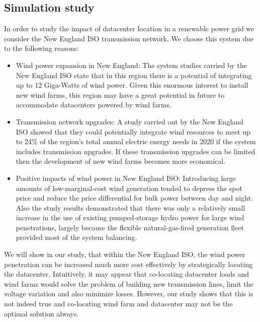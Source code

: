 \subsection{Simulation study}
In order to study the impact of datacenter location in a renewable power grid we consider the New England ISO transmission network. We choose this system due to the following reasons:
\begin{itemize}
\item{Wind power expansion in New England: The system studies carried by the New England ISO state that in this region there is a potential of integrating up to 12 Giga-Watts of wind power. Given this enormous interest to install new wind farms, this region may have a great potential in future to accommodate datacenters powered by wind farms.}
\item{Transmission network upgrades: A study carried out by the New England ISO showed that they could potentially integrate wind resources to meet up to 24\% of the region's total annual electric energy needs in 2020 if the system includes transmission
upgrades. If these transmission upgrades can be limited then the development of new wind farms becomes more economical.}
\item{Positive impacts of wind power in New England ISO: Introducing large amounts of low-marginal-cost wind generation tended to depress the spot price and reduce the price differential for bulk power between day and night. Also the study results demonstrated that there was only a relatively small increase in the use of existing pumped-storage hydro power for large wind penetrations, largely because the flexible natural-gas-fired generation fleet provided most of the system balancing.}
\end{itemize}
We will show in our study, that within the New England ISO, the wind power penetration can be increased much more cost effectively by strategically locating the datacenter. Intuitively, it may appear that co-locating datacenter loads and wind farms would solve the problem of building new transmission lines, limit the voltage variation and also minimize losses. However, our study shows that this is not indeed true and co-locating wind farm and datacenter may not be the optimal solution always.
